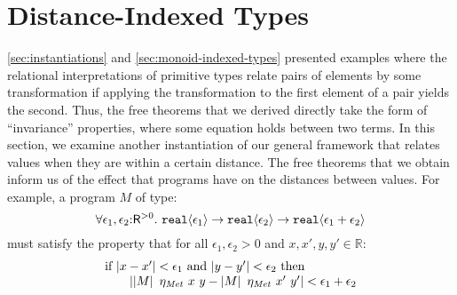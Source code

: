 \section{Distance-Indexed Types}
\label{sec:metric-types}

\newcommand{\Metric}{\mathit{Met}}
\newcommand{\metricSort}{\mathsf{R}^{>0}}

\autoref{sec:instantiations} and \autoref{sec:monoid-indexed-types}
presented examples where the relational interpretations of primitive
types relate pairs of elements by some transformation if applying the
transformation to the first element of a pair yields the second. Thus,
the free theorems that we derived directly take the form of
``invariance'' properties, where some equation holds between two
terms. In this section, we examine another instantiation of our
general framework that relates values when they are within a certain
distance. The free theorems that we obtain inform us of the effect
that programs have on the distances between values. For example, a
program $M$ of type:
\begin{displaymath}
  \forall \epsilon_1,\epsilon_2\mathord:\metricSort.\ \tyPrim{real}{\epsilon_1} \to \tyPrim{real}{\epsilon_2} \to \tyPrim{real}{\epsilon_1 + \epsilon_2}
\end{displaymath}
must satisfy the property that for all $\epsilon_1, \epsilon_2 > 0$
and $x, x', y, y' \in \mathbb{R}$:
\begin{displaymath}
  \begin{array}{l}
    \textrm{if }\abs{x - x'} < \epsilon_1 \textrm{ and } \abs{y - y'} < \epsilon_2 \textrm{ then}\\
    \hspace{2em}\abs{\tmSem{M}\ \eta_\Metric\ x\ y - \tmSem{M}\ \eta_\Metric\ x'\ y'} < \epsilon_1 + \epsilon_2
  \end{array}
\end{displaymath}

